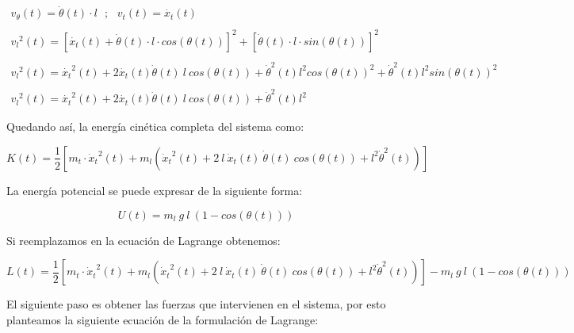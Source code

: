 \documentclass[11pt]{article}
\begin{document}
\begin{equation}
	\label{eq:lagrangiano_velocidades_energia_cinetica}
	\begin{matrix}v_{\theta }(t)=\dot{\theta }(t)\cdot l\ \ \ ;\ \ \ v_{t}(t)=\dot{x_{t}}(t) \\ \\ {v_{l}}^{2}(t)=\left [ \dot{x_{t}}(t)+\dot{\theta }(t)\cdot l\cdot cos\left ( \theta (t) \right ) \right ]^{2} + \left [ \dot{\theta }(t)\cdot l\cdot sin\left ( \theta (t) \right ) \right ]^{2} \\ \\ {v_{l}}^{2}(t)= {\dot{x_{t}}}^{2}(t)+2\dot{x_{t}}(t)\dot{\theta }(t)\:l\:cos(\theta (t))+ {\dot{\theta}}^{2}(t)l^{2}cos(\theta (t))^{2}+ {\dot{\theta}}^{2}(t)l^{2}sin(\theta (t))^{2}\\ \\ {v_{l}}^{2}(t)={\dot{x_{t}}}^{2}(t)+2\dot{x_{t}}(t)\dot{\theta }(t)\:l\:cos(\theta (t))+ {\dot{\theta}}^{2}(t)l^{2}\end{matrix}
\end{equation}

Quedando así, la energía cinética completa del sistema como:

\begin{equation}
	\label{eq:lagrangiano_energia_cinetica_completa}
	K(t)=\frac{1}{2}\left [ m_{t}\cdot {\dot{x}_{t}}^{2}(t)+m_{l} \left ( {\dot{x}_{t}}^{2}(t)+2\ l\ \dot{x}_{t}(t)\ \dot{\theta}(t)\ cos(\theta(t))+ {l}^2 {\dot{\theta}}^{2}(t) \right ) \right ]
\end{equation}

La energía potencial se puede expresar de la siguiente forma:

\begin{equation}
	\label{eq:lagrangiano_energia_potencial}
	U(t)=m_{l}\ g\ l\ (1-cos(\theta (t)))
\end{equation}

Si reemplazamos en la ecuación de Lagrange obtenemos:

\begin{equation}
	\label{eq:lagrangiano_completo}
	L(t)=\frac{1}{2}\left [ m_{t}\cdot {\dot{x}_{t}}^{2}(t)+m_{l} \left ( {\dot{x}_{t}}^{2}(t)+2\ l\ \dot{x}_{t}(t)\ \dot{\theta}(t)\ cos(\theta(t))+ {l}^2 {\dot{\theta}}^{2}(t) \right ) \right ]-m_{l}\ g\ l\ (1-cos(\theta (t)))
\end{equation}

El siguiente paso es obtener las fuerzas que intervienen en el sistema, por esto planteamos la siguiente ecuación de la formulación de Lagrange:
\end{document}
